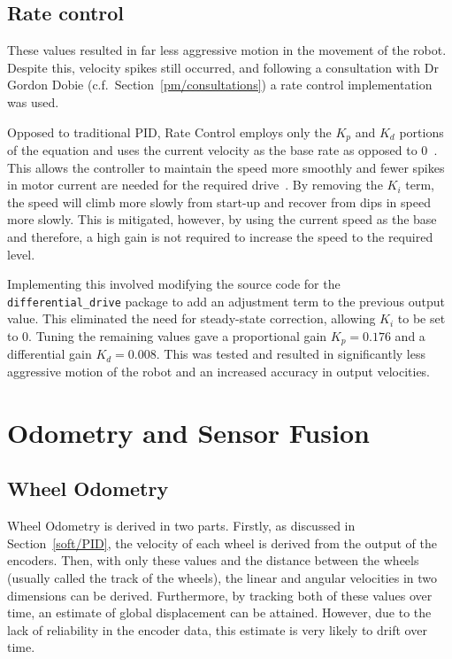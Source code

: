 \subsection{Rate control}\label{soft/PID/rate}

These values resulted in far less aggressive motion in the movement of the
robot. Despite this, velocity spikes still occurred, and following a
consultation with Dr Gordon Dobie (c.f.\ Section~\ref{pm/consultations}) a
rate control implementation was used.

Opposed to traditional PID, Rate Control employs only the $K_p$ and $K_d$ portions of
the equation and uses the current velocity as the base rate as opposed to 0~\cite{koditschek1987quadratic}. This allows the controller to maintain the speed
more smoothly and fewer spikes in motor current are needed for the required
drive~\cite{kawamura1988local}. By removing the $K_i$ term, the speed will climb
more slowly from start-up and recover from dips in speed more slowly. This is
mitigated, however, by using the current speed as the base and therefore, a high
gain is not required to increase the speed to the required level.

Implementing this involved modifying the source
code for the \verb|differential_drive| package to add an adjustment term to the
previous output value. This eliminated the need for steady-state correction,
allowing $K_i$ to be set to $0$. Tuning the remaining values gave a proportional
gain $K_p = 0.176$ and a differential gain $K_d = 0.008$. This was tested and
resulted in significantly less aggressive motion of the robot and an increased
accuracy in output velocities.



\section{Odometry and Sensor Fusion}\label{soft/odometry}

\subsection{Wheel Odometry}\label{soft/odometry/wheel}

Wheel Odometry is derived in two parts. Firstly, as discussed in Section~\ref{soft/PID}, the velocity of each wheel is derived from the output of the
encoders. Then, with only these values and the distance between the wheels
(usually called the track of the wheels), the linear and angular velocities in two
dimensions can be derived. Furthermore, by tracking both of these values over
time, an estimate of global displacement can be attained. However, due to the lack
of reliability in the encoder data, this estimate is very likely to drift over
time.

